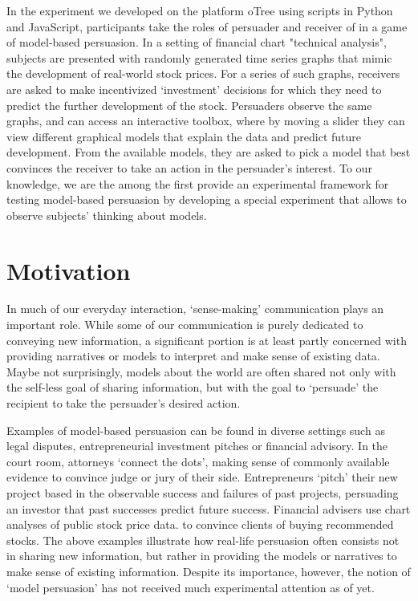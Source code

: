 \documentclass[11pt, a4paper, leqno]{article}
\begin{document}
In the experiment we developed on the platform oTree using scripts in Python and JavaScript, participants take the roles of persuader and receiver of in a game of model-based persuasion. In a setting of financial chart "technical analysis", subjects are presented with randomly generated time series graphs that mimic the development of real-world stock prices. For a series of such graphs, receivers are asked to make incentivized `investment' decisions for which they need to predict the further development of the stock. Persuaders observe the same graphs, and can access an interactive toolbox, where by moving a slider they can view different graphical models that explain the data and predict future development. From the available models, they are asked to pick a model that best convinces the receiver to take an action in the persuader's interest. To our knowledge, we are the among the first provide an experimental framework for testing model-based persuasion by developing a special experiment that allows to observe subjects' thinking about models.


\section{Motivation}

In much of our everyday interaction, `sense-making' communication plays an important role. While some of our communication is purely dedicated to conveying new information, a significant portion is at least partly concerned with providing narratives or models to interpret and make sense of existing data. Maybe not surprisingly, models about the world are often shared not only with the self-less goal of sharing information, but with the goal to `persuade' the recipient to take the persuader's desired action.

Examples of model-based persuasion can be found in diverse settings such as legal disputes, entrepreneurial investment pitches or financial advisory. In the court room, attorneys  `connect the dots', making sense of commonly available evidence to convince judge or jury of their side. Entrepreneurs `pitch' their new project based in the observable success and failures of past projects, persuading an investor that past successes predict future success. Financial advisers use chart analyses of public stock price data. to convince clients of buying recommended stocks. The above examples illustrate how real-life persuasion often consists not in sharing new information, but rather in providing the models or narratives to make sense of existing information. Despite its importance, however, the notion of `model persuasion' has not received much experimental attention as of yet. 
\end{document}

